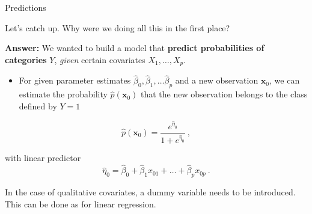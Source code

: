 \documentclass[10pt,ignorenonframetext,]{beamer}
\providecommand{\tightlist}{%
  \setlength{\itemsep}{0pt}\setlength{\parskip}{0pt}}
\begin{document}
\begin{frame}

\begin{block}{Predictions}

\vspace{2mm}

Let's catch up. Why were we doing all this in the first place?

\vspace{2mm}

\textbf{Answer:} We wanted to build a model that \textbf{predict
probabilities of categories} \(Y\), \emph{given} certain covariates
\(X_1, \ldots, X_p\).

\vspace{2mm}

\begin{itemize}
\tightlist
\item
  For given parameter estimates
  \(\hat\beta_0, \hat\beta_1, \ldots \hat\beta_p\) and a new observation
  \({\boldsymbol x}_0\), we can estimate the probability
  \(\hat{p}({\boldsymbol x}_0)\) that the new observation belongs to the
  class defined by \(Y=1\)
\end{itemize}

\[\hat{p}({\boldsymbol x}_0) = \frac{e^{\hat{\eta}_0}}{1+e^{\hat{\eta}_0}} \ , \]

with linear predictor
\[\hat\eta_0 = \hat\beta_0 + \hat\beta_1 x_{01} + \ldots + \hat\beta_p x_{0p} \ .\]

In the case of qualitative covariates, a dummy variable needs to be
introduced. This can be done as for linear regression.

\end{block}

\end{frame}
\end{document}
